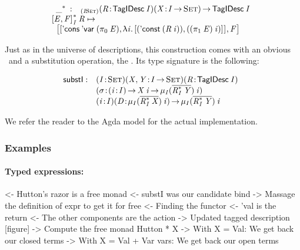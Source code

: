 \[\stk{
\begin{array}{ll}
\FreeIMonad{\_}{} : & _{\PITEL{\V{I}}{\Set}}
                     \PITEL{\V{R}}{\TagIDesc{\V{I}}} 
                     \PITEL{\V{X}}{\V{I} \To \Set}\To 
                      \TagIDesc{\V{I}}
\end{array} \\
\FreeIMonad{\pair{\V{E}}{\V{F}}{}}{\V{I}}{\V{R}} \mapsto \\ \;\;
    \pair{\pair{\ListCons{\DVar{\!}}{(\fst{\V{E}})}} 
               {\LAM{\V{i}}
                \pair{(\DConst{(\V{R}\: \V{i})})}
                     {((\snd{\V{E}})\: \V{i})}{}}{}}
         {\V{F}}{}
}\]

Just as in the universe of descriptions, this construction comes with
an obvious \return\ and a substitution operation, the \bind. Its type
signature is the following:

\newcommand{\substI}{\F{substI}}

\[
\begin{array}{@{}ll}
\substI : & \PITEL{\V{I}}{\Set}
            \PITEL{\V{X}, \V{Y}}{\V{I} \To \Set}
            \PITEL{\V{R}}{\TagIDesc{\V{I}}} \\
          & \PITEL{\V{\sigma}}{\PI{\V{i}}{\V{I}} \V{X}\:\V{i} \To 
                               \IMu{\V{I}}{(\toIDesc{\FreeIMonad{\V{R}}{\V{I}}{\V{Y}}})}{\V{i}}} \\
          & \PITEL{\V{i}}{\V{I}}
            \PITEL{\V{D}}{\IMu{I}{(\toIDesc{\FreeIMonad{\V{R}}{\V{I}}{\V{X}}})}{\V{i}}} \To
            \IMu{I}{(\toIDesc{\FreeIMonad{\V{R}}{\V{I}}{\V{Y}}})}{\V{i}}
\end{array}
\]

We refer the reader to the Agda model for the actual implementation.

\subsubsection{Examples}

\paragraph{Typed expressions:}

\begin{wstructure}
<- Hutton's razor is a free monad
    <- substI was our candidate bind
        -> Massage the definition of expr to get it for free
    <- Finding the functor
        <- 'val is the return
        <- The other components are the action
        -> Updated tagged description [figure]
    -> Compute the free monad Hutton * X
        -> With X = Val: We get back our closed terms
        -> With X = Val + Var vars: We get back our open terms
\end{wstructure}

